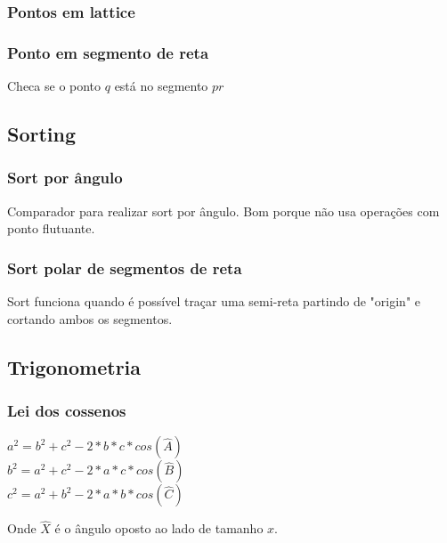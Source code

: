 \subsubsection{Pontos em lattice}
\divisor

\subsubsection{Ponto em segmento de reta}
Checa se o ponto $q$ est\'{a} no segmento $pr$
\divisor


\subsection{Sorting}
\subsubsection{Sort por \^{a}ngulo}
Comparador para realizar sort por \^{a}ngulo. Bom porque n\~{a}o usa opera\c{c}\~{o}es com ponto flutuante.
\divisor

\subsubsection{Sort polar de segmentos de reta}
Sort funciona quando \'{e} poss\'{i}vel tra\c{c}ar uma semi-reta partindo de "origin" e cortando ambos os segmentos.
\divisor


\subsection{Trigonometria}

\subsubsection{Lei dos cossenos}

$a^2 = b^2 + c^2 - 2*b*c*cos(\hat{A})$
\\$b^2 = a^2 + c^2 - 2*a*c*cos(\hat{B})$
\\$c^2 = a^2 + b^2 - 2*a*b*cos(\hat{C})$

Onde $\hat{X}$ \'{e} o \^{a}ngulo oposto ao lado de tamanho $x$.
\divisor
